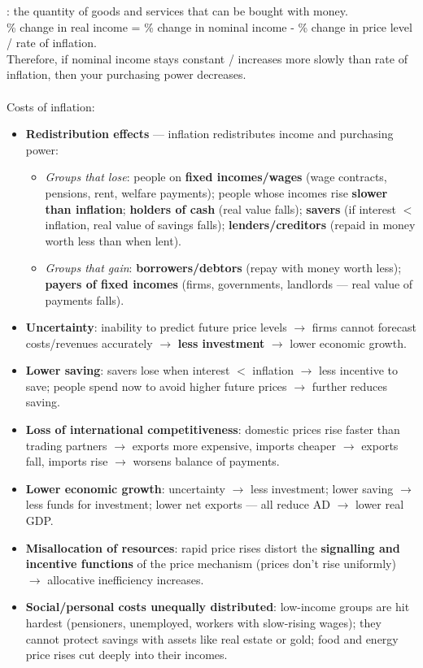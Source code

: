 : the quantity of goods and services that can be bought with money.\\
\% change in real income = \% change in nominal income - \% change in price level / rate of inflation.\\
Therefore, if nominal income stays constant / increases more slowly than rate of inflation, then your purchasing power decreases.\\\\
Costs of inflation:
\begin{itemize}
  \item \textbf{Redistribution effects} --- inflation redistributes income and purchasing power:
  \begin{itemize}
    \item \textit{Groups that lose}: people on \textbf{fixed incomes/wages} (wage contracts, pensions, rent, welfare payments); people whose incomes rise \textbf{slower than inflation}; \textbf{holders of cash} (real value falls); \textbf{savers} (if interest $<$ inflation, real value of savings falls); \textbf{lenders/creditors} (repaid in money worth less than when lent).
    \item \textit{Groups that gain}: \textbf{borrowers/debtors} (repay with money worth less); \textbf{payers of fixed incomes} (firms, governments, landlords --- real value of payments falls).
  \end{itemize}
  \item \textbf{Uncertainty}: inability to predict future price levels $\to$ firms cannot forecast costs/revenues accurately $\to$ \textbf{less investment} $\to$ lower economic growth.
  \item \textbf{Lower saving}: savers lose when interest $<$ inflation $\to$ less incentive to save; people spend now to avoid higher future prices $\to$ further reduces saving.
  \item \textbf{Loss of international competitiveness}: domestic prices rise faster than trading partners $\to$ exports more expensive, imports cheaper $\to$ exports fall, imports rise $\to$ worsens balance of payments.
  \item \textbf{Lower economic growth}: uncertainty $\to$ less investment; lower saving $\to$ less funds for investment; lower net exports --- all reduce AD $\to$ lower real GDP.
  \item \textbf{Misallocation of resources}: rapid price rises distort the \textbf{signalling and incentive functions} of the price mechanism (prices don't rise uniformly) $\to$ allocative inefficiency increases.
  \item \textbf{Social/personal costs unequally distributed}: low-income groups are hit hardest (pensioners, unemployed, workers with slow-rising wages); they cannot protect savings with assets like real estate or gold; food and energy price rises cut deeply into their incomes.
\end{itemize}
